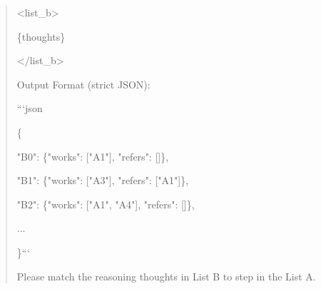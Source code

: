 \begin{quote}
\textless{}list\_b\textgreater{}\par
\{thoughts\}\par
\textless{}/list\_b\textgreater{}\par
Output Format (strict JSON):\par
```json\par
\{\par
  "B0": \{"works": ["A1"], "refers": []\},\par
  "B1": \{"works": ["A3"], "refers": ["A1"]\},\par
  "B2": \{"works": ["A1", "A4"], "refers": []\},\par
  ...\par
\}```\par
Please match the reasoning thoughts in List B to step in the List A.\par
\end{quote}
